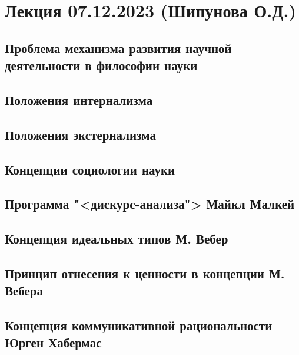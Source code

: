 \documentclass[main.tex]{subfiles}
\begin{document}
\section{Лекция 07.12.2023 (Шипунова О.Д.)}


\subsection{Проблема механизма развития научной деятельности в философии науки}


\subsection{Положения интернализма}


\subsection{Положения экстернализма}


\subsection{Концепции социологии науки}


\subsection{Программа "<дискурс-анализа"> Майкл Малкей}


\subsection{Концепция идеальных типов М. Вебер}


\subsection{Принцип отнесения к ценности в концепции М. Вебера}


\subsection{Концепция коммуникативной рациональности Юрген Хабермас}
\end{document}
